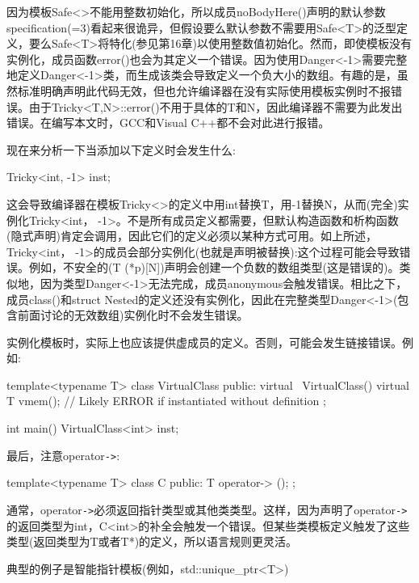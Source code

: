 因为模板Safe<>不能用整数初始化，所以成员noBodyHere()声明的默认参数specification(=3)看起来很诡异，但假设要么默认参数不需要用Safe<T>的泛型定义，要么Safe<T>将特化(参见第16章)以使用整数值初始化。然而，即使模板没有实例化，成员函数error()也会为其定义一个错误。因为使用Danger<-1>需要完整地定义Danger<-1>类，而生成该类会导致定义一个负大小的数组。有趣的是，虽然标准明确声明此代码无效，但也允许编译器在没有实际使用模板实例时不报错误。由于Tricky<T,N>::error()不用于具体的T和N，因此编译器不需要为此发出错误。在编写本文时，GCC和Visual C++都不会对此进行报错。

现在来分析一下当添加以下定义时会发生什么:

\begin{cpp}
Tricky<int, -1> inst;
\end{cpp}

这会导致编译器在模板Tricky<>的定义中用int替换T，用-1替换N，从而(完全)实例化Tricky<int， -1>。不是所有成员定义都需要，但默认构造函数和析构函数(隐式声明)肯定会调用，因此它们的定义必须以某种方式可用。如上所述，Tricky<int， -1>的成员会部分实例化(也就是声明被替换):这个过程可能会导致错误。例如，不安全的(T (*p)[N])声明会创建一个负数的数组类型(这是错误的)。类似地，因为类型Danger<-1>无法完成，成员anonymous会触发错误。相比之下，成员class()和struct Nested的定义还没有实例化，因此在完整类型Danger<-1>(包含前面讨论的无效数组)实例化时不会发生错误。

实例化模板时，实际上也应该提供虚成员的定义。否则，可能会发生链接错误。例如:

\begin{cpp}
template<typename T>
class VirtualClass {
	public:
	virtual ~VirtualClass() {}
	virtual T vmem(); // Likely ERROR if instantiated without definition
};

int main()
{
	VirtualClass<int> inst;
}
\end{cpp}

最后，注意operator\texttt{->}:

\begin{cpp}
template<typename T>
class C {
	public:
	T operator-> ();
};
\end{cpp}

通常，operator\texttt{->}必须返回指针类型或其他类类型。这样，因为声明了operator\texttt{->}的返回类型为int，C<int>的补全会触发一个错误。但某些类模板定义触发了这些类型(返回类型为T或者T*)的定义，所以语言规则更灵活。

\begin{notice}典型的例子是智能指针模板(例如，std::unique\_ptr<T>)
\end{notice}

